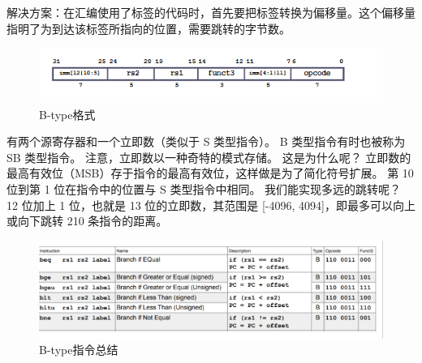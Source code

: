 \documentclass{ctexart}
\begin{document}
解决方案：在汇编使用了标签的代码时，首先要把标签转换为偏移量。这个偏移量指明了为到达该标签所指向的位置，需要跳转的字节数。 \par
\begin{figure}
    \centering
    \includegraphics[width=0.5\linewidth]{B-type格式.png}
    \caption{B-type格式}
    \label{fig:enter-label}
\end{figure}
有两个源寄存器和一个立即数（类似于 S 类型指令）。
B 类型指令有时也被称为 SB 类型指令。
注意，立即数以一种奇特的模式存储。
这是为什么呢？
立即数的最高有效位（MSB）存于指令的最高有效位，这样做是为了简化符号扩展。
第 10 位到第 1 位在指令中的位置与 S 类型指令中相同。
我们能实现多远的跳转呢？
12 位加上 1 位，也就是 13 位的立即数，其范围是 [-4096, 4094]，即最多可以向上或向下跳转 210 条指令的距离。
\begin{figure}
    \centering
    \includegraphics[width=0.5\linewidth]{B-type指令总结.png}
    \caption{B-type指令总结}
    \label{fig:enter-label}
\end{figure}
\end{document}
